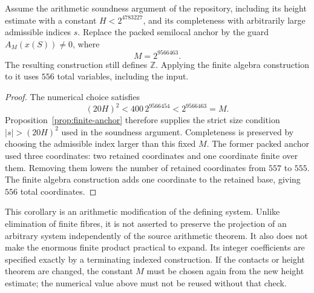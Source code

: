 \begin{corollary}
\label{cor:556-anchor}
Assume the arithmetic soundness argument of the repository, including its
height estimate with a constant $H<2^{4783227}$, and its completeness with
arbitrarily large admissible indices $s$.  Replace the packed semilocal
anchor by the guard $A_M(x(S))\ne0$, where
\[
                    M=2^{9566463}.
\]
The resulting construction still defines $\mathbb Z$.  Applying the
finite algebra construction to it uses $556$ total variables, including the
input.
\end{corollary}
\begin{proof}
The numerical choice satisfies
\[
 (20H)^2<400\,2^{9566454}<2^{9566463}=M.
\]
Proposition~\ref{prop:finite-anchor} therefore supplies the strict size
condition $|s|>(20H)^2$ used in the soundness argument.  Completeness is
preserved by choosing the admissible index larger than this fixed $M$.
The former packed anchor used three coordinates: two retained coordinates
and one coordinate finite over them.  Removing them lowers the number of
retained coordinates from $557$ to $555$.  The finite algebra construction
adds one coordinate to the retained base, giving $556$ total coordinates.
\end{proof}

This corollary is an arithmetic modification of the defining system.
Unlike elimination of finite fibres, it is not asserted to preserve the
projection of an arbitrary system independently of the source arithmetic
theorem.  It also does not make the enormous finite product practical to
expand.  Its integer coefficients are specified exactly by a terminating
indexed construction.  If the contacts or height theorem are changed, the
constant $M$ must be chosen again from the new height estimate; the
numerical value above must not be reused without that check.

